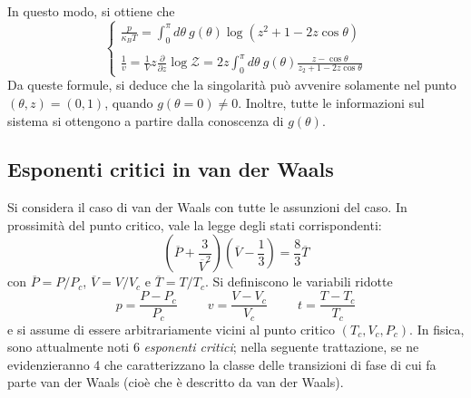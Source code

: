 \documentclass[11pt, a4paper]{scrartcl}
\theoremstyle{style}
\theoremstyle{style1}
\numberwithin{equation}{subsection}
\begin{document}
In questo modo, si ottiene che
\[
\begin{cases}
	\displaystyle \frac{p}{\kappa _B T} = \int_{0} ^\pi d\theta \ g(\theta ) \log\left(z^2 + 1 - 2z \cos \theta \right) \\
	\\
	\displaystyle \frac{1}{v} = \frac{1}{V}z\frac{\partial }{\partial z} \log\mathcal{Z}  = 2z \int_{0} ^\pi d\theta \ g(\theta ) \frac{z-\cos \theta }{z_2 + 1 - 2z \cos \theta }
\end{cases}
\] 
Da queste formule, si deduce che la singolarit\`a pu\`o avvenire solamente nel punto $(\theta ,z) = (0,1)$, quando $g(\theta =0) \neq 0 $.
Inoltre, tutte le informazioni sul sistema si ottengono a partire dalla conoscenza di $g(\theta )$.
\subsection{Esponenti critici in van der Waals}
Si considera il caso di van der Waals con tutte le assunzioni del caso. 
In prossimit\`a del punto critico, vale la legge degli stati corrispondenti:
\[
\left(\overline{P}+\frac{3}{\overline{V}^2}\right) \left(\overline{V}-\frac{1}{3}\right) = \frac{8}{3}\overline{T}
\] 
con $\overline{P}= P / P_c$, $\overline{V}= V / V_c$ e $\overline{T} = T / T_c$.
Si definiscono le variabili ridotte
\[
 p = \frac{P-P_c}{P_c}\hspace{1cm}v = \frac{V-V_c}{V_c} \hspace{1cm} t = \frac{T-T_c}{T_c}
\] 
e si assume di essere arbitrariamente vicini al punto critico $(T_c,V_c,P_c)$.
In fisica, sono attualmente noti 6 \textit{esponenti critici}; nella seguente trattazione, se ne evidenzieranno 4 che caratterizzano la classe delle transizioni di fase di cui fa parte van der Waals (cio\`e che \`e descritto da van der Waals).
\end{document}
